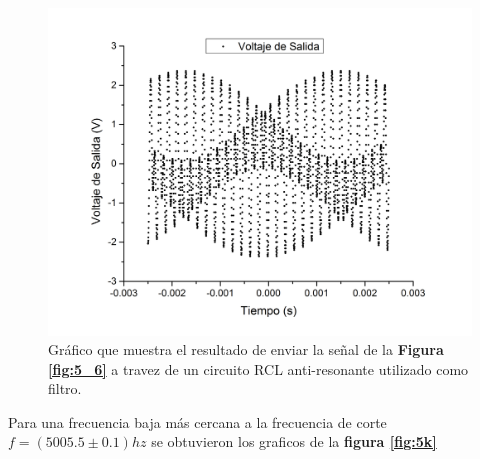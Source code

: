 \documentclass[11pt,a4paper]{article}
\begin{document}
\begin{figure}[H]
\centering
\includegraphics[scale=0.5]{5600hz_Filtrado}
\caption{Gráfico que muestra el resultado de enviar la señal de la \textbf{Figura \ref{fig:5_6}} a travez de un circuito RCL anti-resonante utilizado como filtro.}
\label{fig:5_6_Filt}
\end{figure}

Para una frecuencia baja más cercana a la frecuencia de corte $f= (5005.5 \pm 0.1)hz$ se obtuvieron los graficos de la \textbf{figura \ref{fig:5k}}
\end{document}

